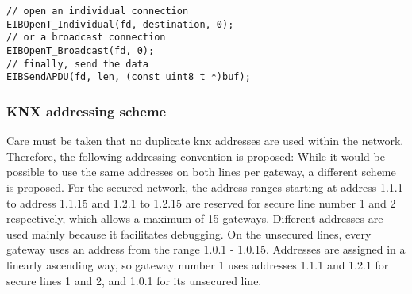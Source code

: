 \begin{lstlisting}[style=cStyle,caption={Writing to \gls{knx} frames},label=lst:knxWrite]
// open an individual connection
EIBOpenT_Individual(fd, destination, 0);
// or a broadcast connection
EIBOpenT_Broadcast(fd, 0);
// finally, send the data
EIBSendAPDU(fd, len, (const uint8_t *)buf);
\end{lstlisting}

\subsubsection{KNX addressing scheme}

Care must be taken that no duplicate \gls{knx} addresses are used within the network. Therefore, the following addressing convention is proposed:
While it would be possible to use the same addresses on both lines per gateway, a different scheme is proposed.
For the secured network, the address ranges starting at address 1.1.1 to address 1.1.15 and 1.2.1 to 1.2.15 are reserved for secure line number
1 and 2 respectively, which allows a maximum of 15 gateways. Different addresses are used mainly because it facilitates debugging. 
On the unsecured lines, every gateway uses an address from the range 1.0.1 - 1.0.15. Addresses are assigned in a linearly ascending way, so gateway number 1
uses addresses 1.1.1 and 1.2.1 for secure lines 1 and 2, and 1.0.1 for its unsecured line.

